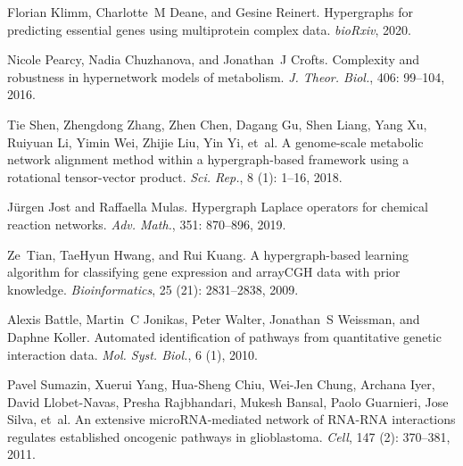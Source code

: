 Florian Klimm, Charlotte~M Deane, and Gesine Reinert.
\newblock Hypergraphs for predicting essential genes using multiprotein complex
data.
\newblock \emph{bioRxiv}, 2020.

Nicole Pearcy, Nadia Chuzhanova, and Jonathan~J Crofts.
\newblock Complexity and robustness in hypernetwork models of metabolism.
\newblock \emph{J. Theor. Biol.}, 406: 99--104, 2016.

Tie Shen, Zhengdong Zhang, Zhen Chen, Dagang Gu, Shen Liang, Yang Xu, Ruiyuan
Li, Yimin Wei, Zhijie Liu, Yin Yi, et~al.
\newblock A genome-scale metabolic network alignment method within a
hypergraph-based framework using a rotational tensor-vector product.
\newblock \emph{Sci. Rep.}, 8 (1): 1--16, 2018{}.

J{\"u}rgen Jost and Raffaella Mulas.
\newblock Hypergraph {{Laplace}} operators for chemical reaction networks.
\newblock \emph{Adv. Math.}, 351: 870--896, 2019.

Ze~Tian, TaeHyun Hwang, and Rui Kuang.
\newblock A hypergraph-based learning algorithm for classifying gene expression
and {{arrayCGH}} data with prior knowledge.
\newblock \emph{Bioinformatics}, 25 (21): 2831--2838, 2009.

Alexis Battle, Martin~C Jonikas, Peter Walter, Jonathan~S Weissman, and Daphne
Koller.
\newblock Automated identification of pathways from quantitative genetic
interaction data.
\newblock \emph{Mol. Syst. Biol.}, 6 (1), 2010.

Pavel Sumazin, Xuerui Yang, Hua-Sheng Chiu, Wei-Jen Chung, Archana Iyer, David
{Llobet-Navas}, Presha Rajbhandari, Mukesh Bansal, Paolo Guarnieri, Jose
Silva, et~al.
\newblock An extensive {{microRNA}}-mediated network of {{RNA}}-{{RNA}}
interactions regulates established oncogenic pathways in glioblastoma.
\newblock \emph{Cell}, 147 (2): 370--381, 2011.

